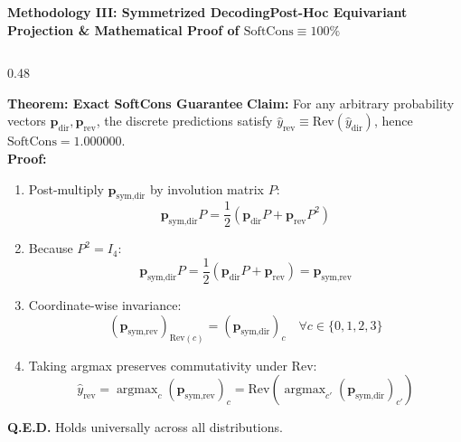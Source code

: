 \documentclass[aspectratio=169,10pt]{beamer}
\begin{document}
\begin{frame}{\textbf{Methodology III: Symmetrized Decoding}}{\textbf{Post-Hoc Equivariant Projection \& Mathematical Proof of $\text{SoftCons} \equiv 100\%$}}
\begin{columns}[T]
    \begin{column}{0.48\textwidth}
      \begin{exampleblock}{\textbf{Theorem: Exact SoftCons Guarantee}}
        \footnotesize
        \textbf{Claim:} For any arbitrary probability vectors $\mathbf{p}_{\text{dir}}, \mathbf{p}_{\text{rev}}$, the discrete predictions satisfy $\hat{y}_{\text{rev}} \equiv \text{Rev}(\hat{y}_{\text{dir}})$, hence $\text{SoftCons} = 1.000000$. \\
        \vspace{0.1cm}
        \textbf{Proof:}
        \begin{enumerate}
          \item Post-multiply $\mathbf{p}_{\text{sym,dir}}$ by involution matrix $P$:
          $$\mathbf{p}_{\text{sym,dir}} P = \frac{1}{2}(\mathbf{p}_{\text{dir}} P + \mathbf{p}_{\text{rev}} P^2)$$
          \item Because $P^2 = I_4$:
          $$\mathbf{p}_{\text{sym,dir}} P = \frac{1}{2}(\mathbf{p}_{\text{dir}} P + \mathbf{p}_{\text{rev}}) = \mathbf{p}_{\text{sym,rev}}$$
          \item Coordinate-wise invariance:
          $$(\mathbf{p}_{\text{sym,rev}})_{\text{Rev}(c)} = (\mathbf{p}_{\text{sym,dir}})_c \quad \forall c \in \{0, 1, 2, 3\}$$
          \item Taking argmax preserves commutativity under $\text{Rev}$:
          $$\hat{y}_{\text{rev}} = \operatorname{argmax}_c (\mathbf{p}_{\text{sym,rev}})_c = \text{Rev}\left(\operatorname{argmax}_{c'} (\mathbf{p}_{\text{sym,dir}})_{c'}\right)$$
        \end{enumerate}
        \textbf{Q.E.D.} Holds universally across all distributions.
      \end{exampleblock}
    \end{column}
  \end{columns}
\end{frame}
\end{document}
